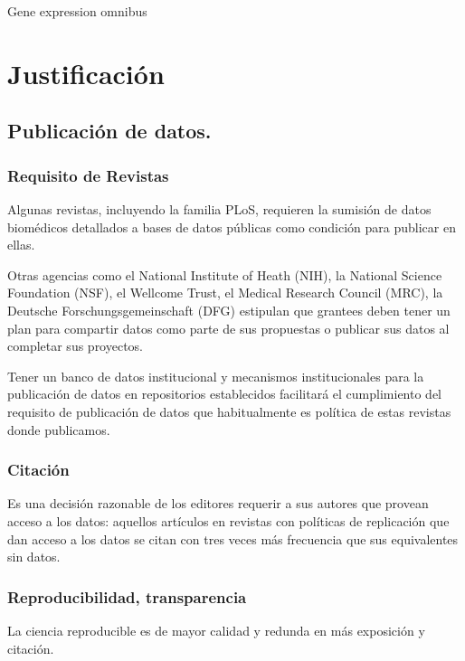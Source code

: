 \documentclass[
10pt, %
letterpaper, %
oneside, %
headinclude,footinclude, %
BCOR5mm, %
]{scrartcl}
\begin{document}
Gene expression omnibus

\section{Justificación}

\subsection{Publicación de datos.}


\subsubsection{Requisito de Revistas}

Algunas revistas, incluyendo la familia PLoS, requieren la sumisión de
datos biomédicos detallados a bases de datos públicas como condición
para publicar en ellas.\cite{piwowar_sharing_2007, hrynaszkiewicz}

Otras agencias como el National Institute of Heath (NIH), la National
Science Foundation (NSF), el Wellcome Trust, el Medical Research
Council (MRC), la Deutsche Forschungsgemeinschaft (DFG) estipulan que
grantees deben tener un plan para compartir datos como parte de sus
propuestas o publicar sus datos al completar sus
proyectos.\cite{wicherts_publish_2012}

Tener un banco de datos institucional y mecanismos institucionales
para la publicación de datos en repositorios establecidos facilitará
el cumplimiento del requisito de publicación de datos que
habitualmente es política de estas revistas donde publicamos.


\subsubsection{Citación}
Es una decisión razonable de los editores requerir a sus autores
que provean acceso a los datos: aquellos artículos en revistas con
políticas de replicación que dan acceso a los datos se citan con tres
veces más frecuencia que sus equivalentes sin datos.\cite{walport_sharing_2011}


\subsubsection{Reproducibilidad, transparencia}
La ciencia reproducible es de mayor calidad y redunda en más exposición y
citación. \cite{piwowar_sharing_2007, ioannidis_improving_2011}
\end{document}
